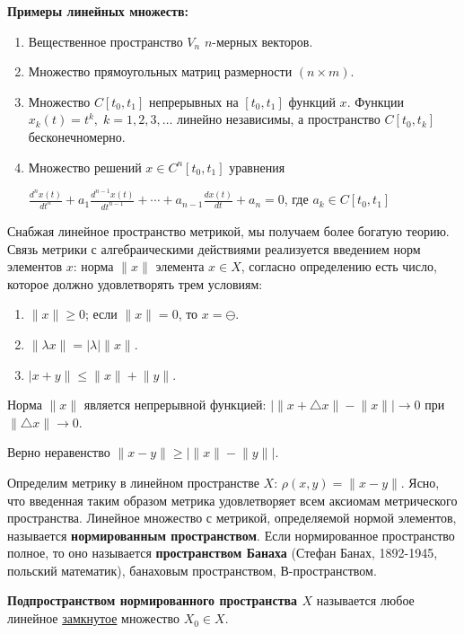 \documentclass[12pt,a4paper,titlepage]{book}
\begin{document}
\textbf{Примеры линейных множеств:}
\begin{enumerate}
\item Вещественное пространство $V_n$ $n$-мерных векторов.
\item Множество прямоугольных матриц размерности $(n\times m)$.
\item Множество $C[t_0,t_1]$ непрерывных на $[t_0,t_1]$ функций $x$. Функции $x_k(t)=t^k,\; k=1,2,3,\dotsc$ линейно независимы, а пространство $C[t_0,t_k]$ бесконечномерно.
\item Множество решений $x\in C^n[t_0,t_1]$ уравнения
\begin{center}
$\frac{d^nx(t)}{dt^n}+a_1\frac{d^{n-1}x(t)}{dt^{n-1}}+\dotsb+a_{n-1}\frac{dx(t)}{dt}+a_n=0$, где $a_k\in C[t_0,t_1]$
\end{center}    
\end{enumerate}
\par Снабжая линейное пространство метрикой, мы получаем более богатую теорию. Связь метрики с алгебраическими действиями реализуется введением норм элементов $x$: норма $\lVert x\rVert$ элемента $x\in X$, согласно определению есть число, которое должно удовлетворять трем условиям:
\begin{enumerate}
\item $\lVert x\rVert \geq 0$; если $\lVert x\rVert = 0$, то $x=\ominus$.
\item $\lVert \lambda x \rVert = \lvert \lambda \rvert \lVert x \rVert$.
\item $\lvert x+y \rVert\leq\lVert x \rVert + \lVert y \rVert$.
\end{enumerate}
\par Норма $\lVert x\rVert$ является непрерывной функцией: $\lvert\lVert x+\triangle x\rVert-\lVert x\rVert\rvert\to0$ при $\lVert\triangle x\rVert\to0$.
\par Верно неравенство $\lVert x-y\rVert\geq\lvert\lVert x\rVert-\lVert y\rVert\rvert$.
\par Определим метрику в линейном пространстве $X$: $\rho(x,y)=\lVert x-y\rVert$. Ясно, что введенная таким образом метрика удовлетворяет всем аксиомам метрического пространства. Линейное множество с метрикой, определяемой нормой элементов, называется \textbf{нормированным пространством}. Если нормированное пространство полное, то оно называется \textbf{пространством Банаха} (Стефан Банах, 1892-1945, польский математик), банаховым пространством, В-пространством.
\par \textbf{Подпространством нормированного пространства $X$} называется любое линейное \underline{замкнутое} множество $X_0 \in X$.
\end{document}
